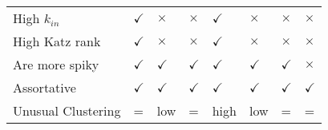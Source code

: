 \begin{tabular}{llllllll}
High $k_{in}$ & $\checkmark$ & $\times$ & $\times$ & $\checkmark$ & $\times$ & $\times$ & $\times$\\
High Katz rank & $\checkmark$ & $\times$ & $\times$ & $\checkmark$ & $\times$ & $\times$ & $\times$\\
Are more spiky & $\checkmark$ & $\checkmark$ & $\checkmark$ & $\checkmark$ & $\checkmark$ & $\checkmark$ & $\times$\\
Assortative& $\checkmark$ & $\checkmark$ & $\checkmark$ & $\checkmark$ & $\checkmark$ & $\checkmark$ & $\checkmark$\\
Unusual Clustering & = & low & = & high & low & = & =\\
\end{tabular}